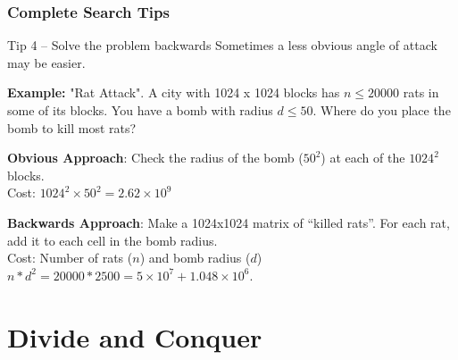 \begin{frame}%
  \frametitle{Complete Search Tips}
    \begin{block}{Tip 4 -- Solve the problem backwards}
      Sometimes a less obvious angle of attack may be easier.
      \bigskip

      {\bf Example:} "Rat Attack". A city with 1024 x 1024 blocks has $n \leq 20000$ rats in some of its blocks. You have a bomb with radius $d \leq 50$. Where do you place the bomb to kill most rats?
      \bigskip

      {\bf Obvious Approach}: Check the radius of the bomb ($50^2$) at each of the $1024^2$ blocks.\\ Cost: $1024^2 \times 50^2 = 2.62\times 10^9$
      \bigskip

      {\bf Backwards Approach}: Make a 1024x1024 matrix of ``killed rats''. For each rat, add it to each cell in the bomb radius.\\
      Cost: Number of rats ($n$) and bomb radius ($d$)\\
      $n * d^2 = 20000*2500 = 5\times10^7 + 1.048\times10^6$.
    \end{block}
\end{frame}

%
%
%


\section{Divide and Conquer}

